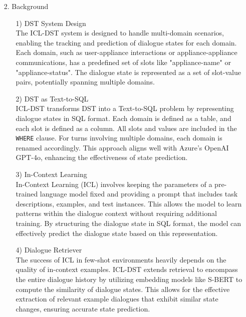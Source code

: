 \documentclass[conference]{IEEEtran}
\begin{document}
\begin{itemize}
    \item [2.] Background
    
    \begin{itemize}
    \item [1)] DST System Design \\
The ICL-DST system is designed to handle multi-domain scenarios, enabling the tracking and prediction of dialogue states for each domain. Each domain, such as user-appliance interactions or appliance-appliance communications, has a predefined set of slots like "appliance-name" or "appliance-status". The dialogue state is represented as a set of slot-value pairs, potentially spanning multiple domains. \\
\end{itemize}

\begin{itemize}
    \item [2)] DST as Text-to-SQL \\
ICL-DST transforms DST into a Text-to-SQL problem by representing dialogue states in SQL format. Each domain is defined as a table, and each slot is defined as a column. All slots and values are included in the \texttt{WHERE} clause. For turns involving multiple domains, each domain is renamed accordingly. This approach aligns well with Azure's OpenAI GPT-4o, enhancing the effectiveness of state prediction. \\
\end{itemize}

\begin{itemize}
    \item [3)] In-Context Learning \\
In-Context Learning (ICL) involves keeping the parameters of a pre-trained language model fixed and providing a prompt that includes task descriptions, examples, and test instances. This allows the model to learn patterns within the dialogue context without requiring additional training. By structuring the dialogue state in SQL format, the model can effectively predict the dialogue state based on this representation. \\
\end{itemize}

\begin{itemize}
    \item [4)] Dialogue Retriever \\
The success of ICL in few-shot environments heavily depends on the quality of in-context examples. ICL-DST extends retrieval to encompass the entire dialogue history by utilizing embedding models like S-BERT to compute the similarity of dialogue states. This allows for the effective extraction of relevant example dialogues that exhibit similar state changes, ensuring accurate state prediction. \\
\end{itemize}

\end{itemize}
\end{document}
